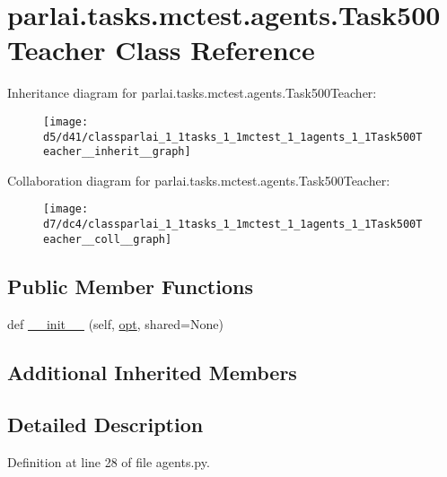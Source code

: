 \hypertarget{classparlai_1_1tasks_1_1mctest_1_1agents_1_1Task500Teacher}{}\section{parlai.\+tasks.\+mctest.\+agents.\+Task500\+Teacher Class Reference}
\label{classparlai_1_1tasks_1_1mctest_1_1agents_1_1Task500Teacher}


Inheritance diagram for parlai.\+tasks.\+mctest.\+agents.\+Task500\+Teacher\+:\nopagebreak
\begin{figure}[H]
\begin{center}
\leavevmode
\texttt{[image: d5/d41/classparlai\_1\_1tasks\_1\_1mctest\_1\_1agents\_1\_1Task500Teacher\_\_inherit\_\_graph]}
\end{center}
\end{figure}


Collaboration diagram for parlai.\+tasks.\+mctest.\+agents.\+Task500\+Teacher\+:\nopagebreak
\begin{figure}[H]
\begin{center}
\leavevmode
\texttt{[image: d7/dc4/classparlai\_1\_1tasks\_1\_1mctest\_1\_1agents\_1\_1Task500Teacher\_\_coll\_\_graph]}
\end{center}
\end{figure}
\subsection*{Public Member Functions}
\begin{DoxyCompactItemize}
\item 
def \hyperlink{classparlai_1_1tasks_1_1mctest_1_1agents_1_1Task500Teacher_a122ab6b53f9bb97f84ae1a5e29a6deca}{\+\_\+\+\_\+init\+\_\+\+\_\+} (self, \hyperlink{classparlai_1_1core_1_1teachers_1_1FbDialogTeacher_af7a9ec497b9cd0292d7b8fa220da7c28}{opt}, shared=None)
\end{DoxyCompactItemize}
\subsection*{Additional Inherited Members}


\subsection{Detailed Description}


Definition at line 28 of file agents.\+py.



